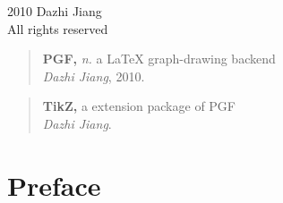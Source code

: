 \documentclass[10pt,a4paper,extrafontsizes]{memoir}
\newcommand{\PWnote}[2]{}
\newif\ifMASTER
\newcommand\svnidlong[4]{}
\begin{document}
\PWnote{2009/06/26}{Updated the copyright page for 9th impression}
\begingroup
\footnotesize
\setlength{\parindent}{0pt}
\setlength{\parskip}{\baselineskip}
\textcopyright{} 2010 Dazhi Jiang \\
All rights reserved


\ifMASTER
Manual last changed \svnyear/\svnmonth/\svnday
\fi

\endgroup

\clearpage
\vspace*{\fill}
\begin{quote}
\textbf{PGF,} \textit{n.} a LaTeX graph-drawing backend \\[0.5\baselineskip]
  \hspace*{\fill} 
      \textit{Dazhi Jiang}, 2010.
\end{quote}

\vspace{2\baselineskip}

\begin{quote}
\textbf{TikZ,} a extension package of PGF \\[0.5\baselineskip]
  \hspace*{\fill} \textit{Dazhi Jiang}.
\end{quote}

\vspace{2\baselineskip}

\vspace*{\fill}

\cleardoublepage

\pagestyle{headings}

\setupshorttoc
\tableofcontents
\clearpage
\setupparasubsecs
\setupmaintoc
\tableofcontents
\setlength{\unitlength}{1pt}
\clearpage
\listoffigures
\clearpage
\listoftables





\chapter{Preface}
\end{document}
